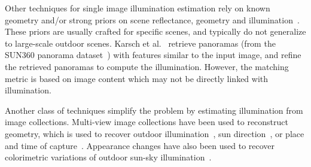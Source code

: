 Other techniques for single image illumination estimation rely on known geometry and/or strong priors on scene reflectance, geometry and illumination~\cite{barron-pami-15,barron2013rgbd,lombardi2016reflectance}. These priors are usually crafted for specific scenes, and typically do not generalize to large-scale outdoor scenes. Karsch et al.~\cite{karsch2014automatic} retrieve panoramas (from the SUN360 panorama dataset~\cite{xiao-cvpr-12}) with features similar to the input image, and refine the retrieved panoramas to compute the illumination. However, the matching metric is based on image content which may not be directly linked with illumination. 

Another class of techniques simplify the problem by estimating illumination from image collections. Multi-view image collections have been used to reconstruct geometry, which is used to recover outdoor illumination~\cite{haber2009relighting,lalonde-3dv-14,shan2015visual,duchene2015multiview}, sun direction~\cite{wehrwein2015shadows}, or place and time of capture~\cite{hauagge2014outdoor}. Appearance changes have also been used to recover colorimetric variations of outdoor sun-sky illumination~\cite{sunkavalli2008color}. 




